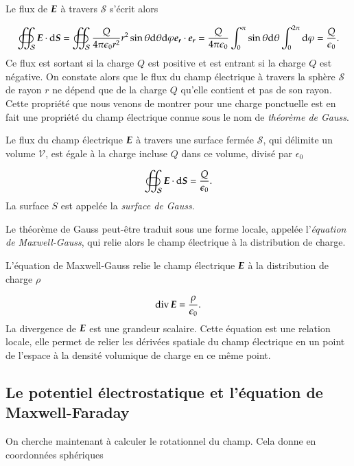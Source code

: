 Le flux de $\vece$ à travers $\mathcal{S}$ s'écrit alors

\begin{equation}
	\oiint_\mathcal{S} \vece \cdot \ds = \oiint_\mathcal{S} \dfrac{Q}{4\pi\epsilon_0 r^2}
	                       r^2 \sin \theta \dtheta \dphi \er \cdot \er
			     = \dfrac{Q}{4 \pi \epsilon_0} \int_0^\pi \sin \theta \dtheta
			     \int_0^{2\pi} \dphi
			     = \dfrac{Q}{\epsilon_0}.
\end{equation}
Ce flux est sortant si la charge $Q$ est positive et est entrant si la charge
$Q$ est négative.
On constate alors que le flux du champ électrique à travers la sphère $\mathcal{S}$
de rayon $r$ ne dépend que de la charge $Q$ qu'elle contient et pas de son rayon.
Cette propriété que nous venons de montrer pour une charge ponctuelle est en 
fait une propriété du champ électrique connue sous le nom de \emph{théorème de 
Gauss}.

\begin{defn}
	Le flux du champ électrique $\vece$ à travers une surface fermée $\mathcal{S}$, 
	qui délimite un volume $\mathcal{V}$, est égale à la charge incluse $Q$ dans
	ce volume, divisé par $\epsilon_0$

	\begin{equation}
		\oiint_\mathcal{S} \vece \cdot \ds = \dfrac{Q}{\epsilon_0}.
		\label{eq:gauss}
	\end{equation}
	La surface $S$ est appelée la \emph{surface de Gauss}.
\end{defn}

Le théorème de Gauss peut-être traduit sous une forme locale, 
appelée l'\emph{équation de 
Maxwell-Gauss}, qui relie alors le champ électrique à la distribution de charge.

\begin{defn}
	L'équation de Maxwell-Gauss relie le champ électrique $\vece$ à la 
	distribution de charge $\rho$

	\begin{equation}
		\div \vece = \dfrac{\rho}{\epsilon_0}.
		\label{eq:MG}
	\end{equation}
	La divergence de $\vece$ est une grandeur scalaire. 
	Cette équation est une relation locale, elle permet de relier
	les dérivées spatiale du champ électrique en un point de l'espace à 
	la densité volumique de charge en ce même point.
\end{defn}

\subsection{Le potentiel électrostatique et l'équation de Maxwell-Faraday}
On cherche maintenant à calculer le rotationnel du champ. 
Cela donne en 
coordonnées sphériques


